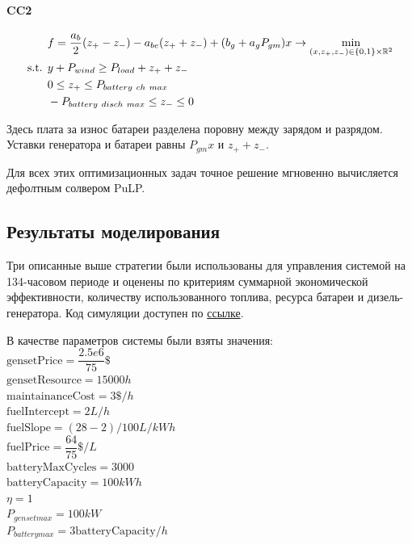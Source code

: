 \paragraph{CC2}

\begin{equation}\label{f:cc2}
\begin{split}
&f = \frac{a_b}{2}(z_+ - z_-) - a_{be}(z_+ + z_-)
+ (b_g  + a_g P_{gm}) x
\rightarrow \min\limits_{(x, z_+, z_-) \in \{0,1\} \times \mathbb{R}^2 }\\
\text{s.t. }& y + P_{wind} \geq P_{load} + z_+ + z_-\\
&0 \leq z_+ \leq P_{battery~ch~max} \\
&-P_{battery~disch~max} \leq z_- \leq 0 \\
\end{split}
\end{equation}


Здесь плата за износ батареи разделена поровну между зарядом и разрядом.
Уставки генератора и батареи равны $P_{gm}x$ и $z_+ + z_-$.

\medskip
Для всех этих оптимизационных задач точное решение мгновенно вычисляется дефолтным солвером PuLP.

\subsection{Результаты моделирования}
Три описанные выше стратегии были использованы для управления системой на 134-часовом периоде и оценены по критериям суммарной экономической эффективности, количеству использованного топлива,  ресурса батареи и дизель-генератора.
Код симуляции доступен по \href{https://github.com/niquepolice/electro/blob/03f136b13663806bfba4a4ce973f524558564363/milp.ipynb}{ссылке}.

В качестве параметров системы были взяты значения:\\
$\text{gensetPrice} = \dfrac{2.5e6}{75}\$$\\
$\text{gensetResource} = 15000h$\\
$\text{maintainanceCost} = 3\$/h$\\
$\text{fuelIntercept} = 2L/h$\\
$\text{fuelSlope} = (28-2)/100 L/kWh$\\
$\text{fuelPrice} = \dfrac{64}{75}\$/L$\\
$\text{batteryMaxCycles} = 3000$\\
$\text{batteryCapacity} = 100kWh$\\
$\eta = 1$ \\
$P_{genset max} = 100kW$ \\
$P_{battery max} = 3\text{batteryCapacity} / h$

